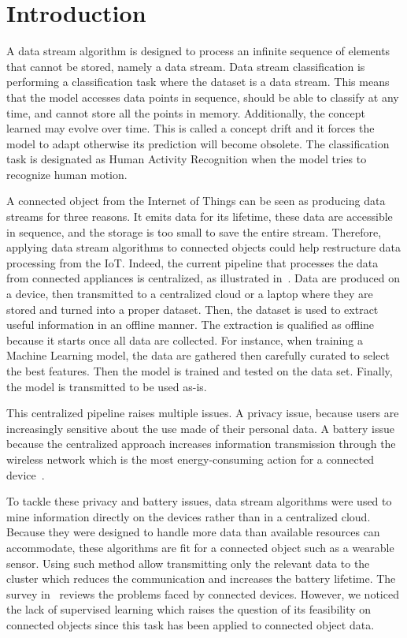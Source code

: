 \section{Introduction}
\label{sec:introduction}
A data stream algorithm is designed to process an infinite sequence of elements
that cannot be stored, namely a data stream. Data stream classification is
performing a classification task where the dataset is a data stream. This means
that the model accesses data points in sequence, should be able to classify at
any time, and cannot store all the points in memory. Additionally, the concept
learned may evolve over time. This is called a concept drift and it forces the
model to adapt otherwise its prediction will become obsolete.  The
classification task is designated as Human Activity Recognition when the model
tries to recognize human motion.

A connected object from the Internet of Things can be seen as producing data
streams for three reasons. It emits data for its lifetime, these data are
accessible in sequence, and the storage is too small to save the entire stream.
Therefore, applying data stream algorithms to connected objects could help
restructure data processing from the IoT.  Indeed, the current pipeline that
processes the data from connected appliances is centralized, as illustrated
in~\cite{recofit}.  Data are produced on a device, then transmitted to a
centralized cloud or a laptop where they are stored and turned into a proper
dataset. Then, the dataset is used to extract useful information in an offline
manner.  The extraction is qualified as offline because it starts once all data
are collected. For instance, when training a Machine Learning model, the data
are gathered then carefully curated to select the best features. Then the model
is trained and tested on the data set. Finally, the model is transmitted to be
used as-is.

This centralized pipeline raises multiple issues.  A privacy issue, because
users are increasingly sensitive about the use made of their personal data.  A
battery issue because the centralized approach increases information
transmission through the wireless network which is the most energy-consuming
action for a connected device~\cite{sensor-network-survey,
sensor-energy-model}.

To tackle these privacy and battery issues, data stream algorithms were used to
mine information directly on the devices rather than in a centralized cloud.
Because they were designed to handle more data than available resources can
accommodate, these algorithms are fit for a connected object such as a wearable
sensor.  Using such method allow transmitting only the relevant data to the
cluster which reduces the communication and increases the battery lifetime. The
survey in~\cite{kejariwal2015} reviews the problems faced by connected devices.
However, we noticed the lack of supervised learning which raises the question
of its feasibility on connected objects since this task has been applied to
connected object data.

